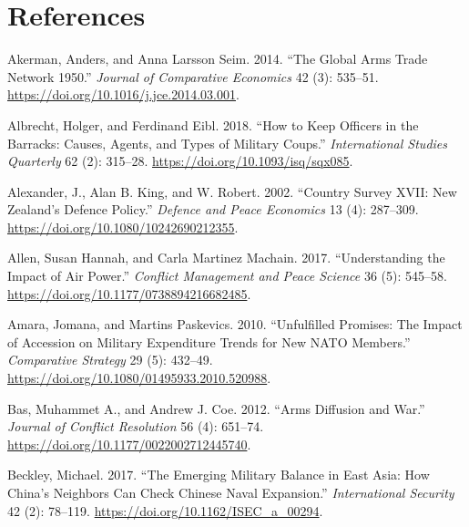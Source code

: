 \documentclass[
]{article}
\newlength{\cslhangindent}
\newlength{\cslentryspacingunit} %
\newenvironment{CSLReferences}[2] %
 {%
  \setlength{\parindent}{0pt}
  \ifodd #1
  \let\oldpar\par
  \def\par{\hangindent=\cslhangindent\oldpar}
  \fi
  \setlength{\parskip}{#2\cslentryspacingunit}
 }%
 {}
\begin{document}
\newpage

\hypertarget{references}{%
\section*{References}\label{references}}

\hypertarget{refs}{}
\begin{CSLReferences}{1}{0}
\leavevmode{}%
Akerman, Anders, and Anna Larsson Seim. 2014. {``The Global Arms Trade Network 1950.''} \emph{Journal of Comparative Economics} 42 (3): 535--51. \url{https://doi.org/10.1016/j.jce.2014.03.001}.

\leavevmode{}%
Albrecht, Holger, and Ferdinand Eibl. 2018. {``How to {Keep Officers} in the {Barracks}: {Causes}, {Agents}, and {Types} of {Military Coups}.''} \emph{International Studies Quarterly} 62 (2): 315--28. \url{https://doi.org/10.1093/isq/sqx085}.

\leavevmode{}%
Alexander, J., Alan B. King, and W. Robert. 2002. {``Country Survey {XVII}: {New} Zealand's Defence Policy.''} \emph{Defence and Peace Economics} 13 (4): 287--309. \url{https://doi.org/10.1080/10242690212355}.

\leavevmode{}%
Allen, Susan Hannah, and Carla Martinez Machain. 2017. {``Understanding the Impact of Air Power.''} \emph{Conflict Management and Peace Science} 36 (5): 545--58. \url{https://doi.org/10.1177/0738894216682485}.

\leavevmode{}%
Amara, Jomana, and Martins Paskevics. 2010. {``Unfulfilled {Promises}: {The Impact} of {Accession} on {Military Expenditure Trends} for {New NATO Members}.''} \emph{Comparative Strategy} 29 (5): 432--49. \url{https://doi.org/10.1080/01495933.2010.520988}.

\leavevmode{}%
Bas, Muhammet A., and Andrew J. Coe. 2012. {``Arms {Diffusion} and {War}.''} \emph{Journal of Conflict Resolution} 56 (4): 651--74. \url{https://doi.org/10.1177/0022002712445740}.

\leavevmode{}%
Beckley, Michael. 2017. {``The {Emerging Military Balance} in {East Asia}: {How China}'s {Neighbors Can Check Chinese Naval Expansion}.''} \emph{International Security} 42 (2): 78--119. \url{https://doi.org/10.1162/ISEC_a_00294}.


\end{CSLReferences}
\end{document}
